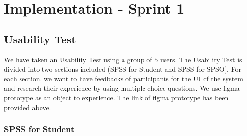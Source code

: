 \chapter{Implementation - Sprint 1}
\section{Usability Test}
We have taken an Usability Test using a group of 5 users. The Usability Test is divided into two sections included (SPSS for Student and SPSS for SPSO). For each section, we want to have feedbacks of participants for the UI of the system and research their experience by using multiple choice questions. We use figma prototype as an object to experience. The link of figma prototype has been provided above.
\subsection{SPSS for Student}
